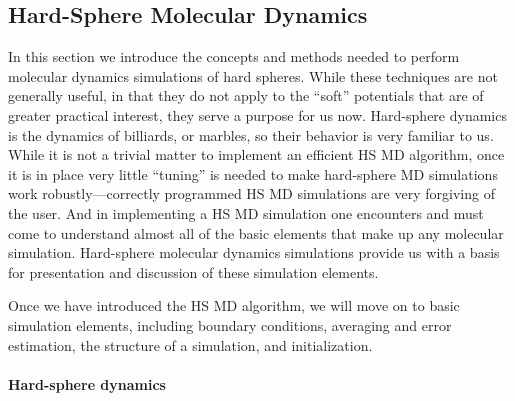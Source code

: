 \documentclass[]{article}
\date{}
\let\oldparagraph\paragraph
\renewcommand{\paragraph}[1]{\oldparagraph{#1}\mbox{}}
\begin{document}
\subsection{Hard-Sphere Molecular
Dynamics}\label{hard-sphere-molecular-dynamics}

In this section we introduce the concepts and methods needed to perform
molecular dynamics simulations of hard spheres. While these techniques
are not generally useful, in that they do not apply to the ``soft''
potentials that are of greater practical interest, they serve a purpose
for us now. Hard-sphere dynamics is the dynamics of billiards, or
marbles, so their behavior is very familiar to us. While it is not a
trivial matter to implement an efficient HS MD algorithm, once it is in
place very little ``tuning'' is needed to make hard-sphere MD
simulations work robustly---correctly programmed HS MD simulations are
very forgiving of the user. And in implementing a HS MD simulation one
encounters and must come to understand almost all of the basic elements
that make up any molecular simulation. Hard-sphere molecular dynamics
simulations provide us with a basis for presentation and discussion of
these simulation elements.

Once we have introduced the HS MD algorithm, we will move on to basic
simulation elements, including boundary conditions, averaging and error
estimation, the structure of a simulation, and initialization.

\paragraph{Hard-sphere dynamics}\label{hard-sphere-dynamics}
\end{document}
